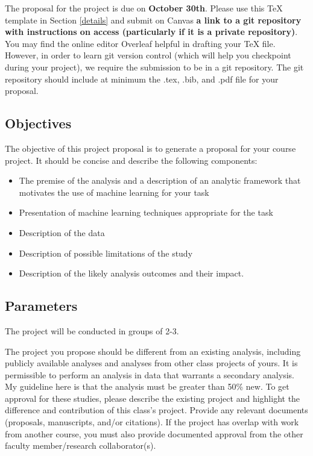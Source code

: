 \documentclass[twoside,11pt]{article}
\begin{document}
The proposal for the project is due on \textbf{October 30th}. Please use this TeX template in Section \ref{details} and submit on Canvas \textbf{a link to a git repository with instructions on access (particularly if it is a private repository)}. You may find the online editor Overleaf helpful in drafting your TeX file. However, in order to learn git version control (which will help you checkpoint during your project), we require the submission to be in a git repository. The git repository should include at minimum the .tex, .bib, and .pdf file for your proposal.

\subsection{Objectives}
The objective of this project proposal is to generate a proposal for your course project. It should be concise and describe the following components:
\begin{itemize}
\item The premise of the analysis and a description of an analytic framework that motivates the use of machine learning for your task
\item Presentation of machine learning techniques appropriate for the task
\item Description of the data
\item Description of possible limitations of the study
\item Description of the likely analysis outcomes and their impact.
\end{itemize}

\subsection{Parameters}
The project will be conducted in groups of 2-3.

The project you propose should be different from an existing analysis, including publicly available analyses and analyses from other class projects of yours. It is permissible to perform an analysis in data that warrants a secondary analysis. My guideline here is that the analysis must be greater than 50\% new. To get approval for these studies, please describe the existing project and highlight the difference and contribution of this class's project. Provide any relevant documents (proposals, manuscripts, and/or citations). If the project has overlap with work from another course, you must also provide documented approval from the other faculty member/research collaborator(s). 
\end{document}
